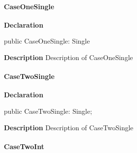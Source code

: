 \documentclass{report}
\begin{document}
\paragraph*{CaseOneSingle}\hspace*{\fill}

\begin{list}{}{
\setlength{\itemindent}{0cm}
\setlength{\listparindent}{0cm}
\setlength{\leftmargin}{\evensidemargin}
\addtolength{\leftmargin}{\tmplength}
\settowidth{\labelsep}{X}
\addtolength{\leftmargin}{\labelsep}
\setlength{\labelwidth}{\tmplength}
}
\begin{flushleft}
\item[\textbf{Declaration}\hfill]
\begin{ttfamily}
public CaseOneSingle: Single\end{ttfamily}


\end{flushleft}
\par
\item[\textbf{Description}]
Description of CaseOneSingle

\end{list}
\paragraph*{CaseTwoSingle}\hspace*{\fill}

\begin{list}{}{
\setlength{\itemindent}{0cm}
\setlength{\listparindent}{0cm}
\setlength{\leftmargin}{\evensidemargin}
\addtolength{\leftmargin}{\tmplength}
\settowidth{\labelsep}{X}
\addtolength{\leftmargin}{\labelsep}
\setlength{\labelwidth}{\tmplength}
}
\begin{flushleft}
\item[\textbf{Declaration}\hfill]
\begin{ttfamily}
public CaseTwoSingle: Single;\end{ttfamily}


\end{flushleft}
\par
\item[\textbf{Description}]
Description of CaseTwoSingle

\end{list}
\paragraph*{CaseTwoInt}\hspace*{\fill}
\end{document}
